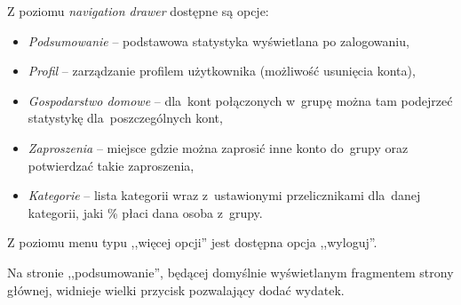 \documentclass[12pt,a4paper,twoside,titlepage,openright]{book}
\begin{document}
\begin{enumerate}
Z poziomu \textit{navigation drawer} dostępne są opcje:
	\begin{itemize}
	\item \textit{Podsumowanie} -- podstawowa statystyka wyświetlana po zalogowaniu,
	\item \textit{Profil} -- zarządzanie profilem użytkownika (możliwość usunięcia konta),
	\item \textit{Gospodarstwo domowe} -- dla~kont połączonych w~grupę można tam podejrzeć statystykę dla~poszczególnych kont,
	\item \textit{Zaproszenia} -- miejsce gdzie można zaprosić inne konto do~grupy oraz potwierdzać takie zaproszenia,
	\item \textit{Kategorie} -- lista kategorii wraz z~ustawionymi przelicznikami dla~danej kategorii, jaki \% płaci dana osoba z~grupy.
	\end{itemize}
	
Z poziomu menu typu ,,więcej opcji'' jest dostępna opcja ,,wyloguj''.

Na stronie ,,podsumowanie'', będącej domyślnie wyświetlanym fragmentem strony głównej, widnieje wielki przycisk pozwalający dodać wydatek.
\end{enumerate}
\end{document}
